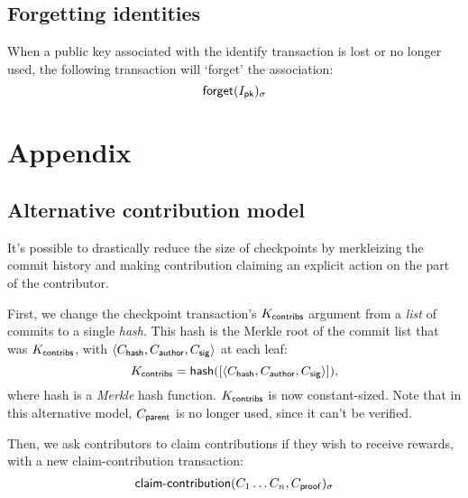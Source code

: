 \subsection{Forgetting identities}
When a public key associated with the \textsf{identify} transaction is lost or no
longer used, the following transaction will `forget' the association:
\[
    \operatorname{\mathsf{forget}}\lparen I_{\mathsf{pk}}\rparen_\sigma
\]

\appendix
\section*{Appendix}

\subsection*{Alternative contribution model}
It's possible to drastically reduce the size of checkpoints by merkleizing the commit
history and making contribution claiming an explicit action on the part of
the contributor.

First, we change the checkpoint transaction's $K_{\mathsf{contribs}}$ argument from a \emph{list}
of commits to a single \emph{hash}. This hash is the Merkle root of the commit list
that was $K_{\mathsf{contribs}}$, with $\langle C_{\mathsf{hash}}, C_{\mathsf{author}}, C_{\mathsf{sig}}\rangle$ at each leaf:
\[
    K_{\mathsf{contribs}} = \operatorname{\mathsf{hash}}(
        [\langle C_{\mathsf{hash}}, C_{\mathsf{author}}, C_{\mathsf{sig}}\rangle]
    ),
\]
where \textsf{hash} is a \emph{Merkle} hash function. $K_{\mathsf{contribs}}$ is
now constant-sized. Note that in this alternative model, $C_{\mathsf{parent}}$ is
no longer used, since it can't be verified.

Then, we ask contributors to claim contributions if they wish to receive rewards, with
a new \textsf{claim-contribution} transaction:
\[
    \operatorname{\mathsf{claim-contribution}}\lparen C_1 \dots C_n, C_{\mathsf{proof}}\rparen_\sigma
\]


